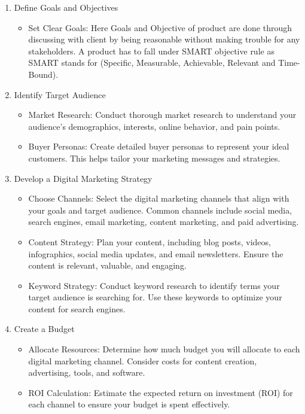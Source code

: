 \begin{enumerate}
    \item Define Goals and Objectives
    \begin{itemize}
        \item Set Clear Goals: Here Goals and Objective of product are done through discussing with client by being reasonable without making trouble for any stakeholders. A product has to fall under SMART objective rule as SMART stands for (Specific, Measurable, Achievable, Relevant and Time-Bound).
    \end{itemize}

    \item Identify Target Audience
        \begin{itemize}
        \item Market Research: Conduct thorough market research to understand your audience's demographics, interests, online behavior, and pain points.
        \item Buyer Personas: Create detailed buyer personas to represent your ideal customers. This helps tailor your marketing messages and strategies.
    \end{itemize}

     \item Develop a Digital Marketing Strategy
     \begin{itemize}
         \item Choose Channels: Select the digital marketing channels that align with your goals and target audience. Common channels include social media, search engines, email marketing, content marketing, and paid advertising.
         \item Content Strategy: Plan your content, including blog posts, videos, infographics, social media updates, and email newsletters. Ensure the content is relevant, valuable, and engaging.
         \item Keyword Strategy: Conduct keyword research to identify terms your target audience is searching for. Use these keywords to optimize your content for search engines.
     \end{itemize}

    \item Create a Budget
    \begin{itemize}
        \item Allocate Resources: Determine how much budget you will allocate to each digital marketing channel. Consider costs for content creation, advertising, tools, and software.
        \item ROI Calculation: Estimate the expected return on investment (ROI) for each channel to ensure your budget is spent effectively.
    \end{itemize}


\end{enumerate}
